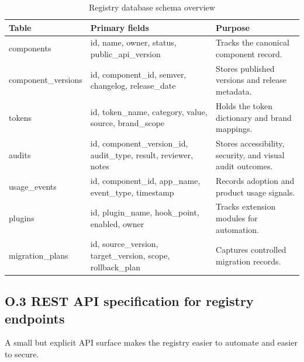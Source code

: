 \begin{table}[htbp]
  \centering
  \caption{Registry database schema overview}
  \begin{tabularx}{\textwidth}{@{}p{}p{}Y@{}}
    \toprule
    \textbf{Table} & \textbf{Primary fields} & \textbf{Purpose} \\
    \midrule
    components & id, name, owner, status, public\_api\_version & Tracks the canonical component record. \\
    component\_versions & id, component\_id, semver, changelog, release\_date & Stores published versions and release metadata. \\
    tokens & id, token\_name, category, value, source, brand\_scope & Holds the token dictionary and brand mappings. \\
    audits & id, component\_version\_id, audit\_type, result, reviewer, notes & Stores accessibility, security, and visual audit outcomes. \\
    usage\_events & id, component\_id, app\_name, event\_type, timestamp & Records adoption and product usage signals. \\
    plugins & id, plugin\_name, hook\_point, enabled, owner & Tracks extension modules for automation. \\
    migration\_plans & id, source\_version, target\_version, scope, rollback\_plan & Captures controlled migration records. \\
    \bottomrule
  \end{tabularx}
\end{table}

\subsection*{O.3 REST API specification for registry endpoints}
A small but explicit API surface makes the registry easier to automate and easier to secure.

